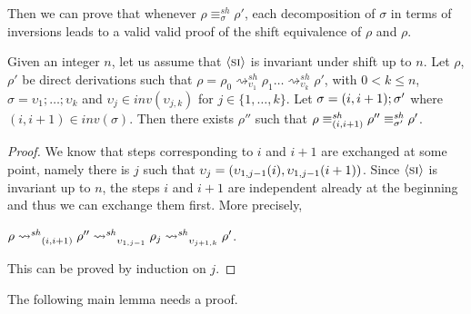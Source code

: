 \documentclass{llncs}
\newcommand{\perm}{\sigma}
\newcommand{\inv}[1]{\ensuremath{inv}({#1})}
\newcommand{\shiftdir}[1][]{\ensuremath{\mathrel{{\rightsquigarrow}^{\mathit{sh}}_{#1}}}}
\newcommand{\shifteq}[1][]{\ensuremath{\mathrel{{\equiv}^\mathit{sh}_{#1}}}}
\begin{document}

Then we can prove that whenever $\rho \shifteq[\perm] \rho'$, each
decomposition of $\perm$ in terms of inversions leads to a valid
valid proof of the shift equivalence  of $\rho$ and $\rho$.

\begin{lemma}
  \label{le:seq-ind-glob2-new}
 Given an integer $n$, let us assume that $\mathrel{\langle \mbox{\textsc{si}}\rangle}$ is invariant under shift up to $n$.  Let $\rho$, $\rho'$ be direct derivations such that $\rho = \rho_0 \shiftdir[\upsilon_1] \rho_1 \ldots
  \shiftdir[\upsilon_k] \rho'$, with $0 < k \leq n$,  
   $\sigma = \upsilon_1; \ldots; \upsilon_k$  and  $\upsilon_j \in \inv{\upsilon_{j,k}}$ for $j \in \{1, \ldots,k\}$. 
  Let
  $\perm = \transp{i}; \perm'$ where $(i,i+1) \in \inv{\perm}$. Then
  there exists $\rho''$ such that
  $\rho \shifteq[\transp{i}] \rho'' \shifteq[\perm']
  \rho'$.
\end{lemma}

\begin{proof}
  We know that steps corresponding to $i$ and $i+1$ are exchanged at
  some point, namely there is $j$ such that
  $\upsilon_j =
  \transp{\upsilon_{1,j-1}(i)}[\upsilon_{1,j-1}(i+1)]$. Since $\mathrel{\langle \mbox{\textsc{si}}\rangle}$ is invariant up to $n$, the steps $i$ and $i+1$ are independent
  already at the beginning and thus we can exchange them first.
  More precisely, 
  \begin{center}
    $\rho \shiftdir_{\transp{i}} \rho'' \shiftdir_{\upsilon_{1,j-1}}
    \rho_j \shiftdir_{\upsilon_{j+1,k}} \rho'$.
  \end{center}
  This can be proved by induction on $j$.
\end{proof}

The following main lemma needs a proof. 
\end{document}

